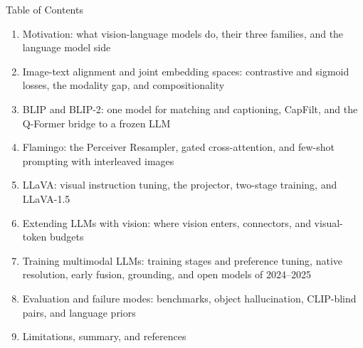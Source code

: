 \begin{frame}{Table of Contents}
  \begin{enumerate}\itemsep0.15em\footnotesize
    \item Motivation: what vision-language models do, their three families, and the language model side
    \item Image-text alignment and joint embedding spaces: contrastive and sigmoid losses, the modality gap, and compositionality
    \item BLIP and BLIP-2: one model for matching and captioning, CapFilt, and the Q-Former bridge to a frozen LLM
    \item Flamingo: the Perceiver Resampler, gated cross-attention, and few-shot prompting with interleaved images
    \item LLaVA: visual instruction tuning, the projector, two-stage training, and LLaVA-1.5
    \item Extending LLMs with vision: where vision enters, connectors, and visual-token budgets
    \item Training multimodal LLMs: training stages and preference tuning, native resolution, early fusion, grounding, and open models of 2024--2025
    \item Evaluation and failure modes: benchmarks, object hallucination, CLIP-blind pairs, and language priors
    \item Limitations, summary, and references
  \end{enumerate}
\end{frame}
